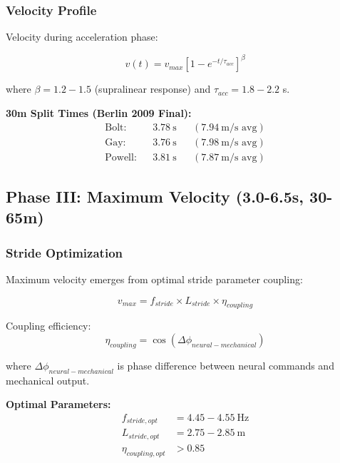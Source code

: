 \subsubsection{Velocity Profile}

Velocity during acceleration phase:

\begin{equation}
v(t) = v_{max} \left[1 - e^{-t/\tau_{acc}}\right]^{\beta}
\label{eq:velocity_acceleration}
\end{equation}

where $\beta = 1.2-1.5$ (supralinear response) and $\tau_{acc} = 1.8-2.2$ s.

\textbf{30m Split Times (Berlin 2009 Final):}
\begin{align}
\text{Bolt:} && 3.78~\text{s} && (7.94~\text{m/s avg}) \\
\text{Gay:} && 3.76~\text{s} && (7.98~\text{m/s avg}) \\
\text{Powell:} && 3.81~\text{s} && (7.87~\text{m/s avg})
\end{align}

\subsection{Phase III: Maximum Velocity (3.0-6.5s, 30-65m)}

\subsubsection{Stride Optimization}

Maximum velocity emerges from optimal stride parameter coupling:

\begin{equation}
v_{max} = f_{stride} \times L_{stride} \times \eta_{coupling}
\label{eq:max_velocity}
\end{equation}

Coupling efficiency:
\begin{equation}
\eta_{coupling} = \cos(\Delta\phi_{neural-mechanical})
\label{eq:coupling_efficiency}
\end{equation}

where $\Delta\phi_{neural-mechanical}$ is phase difference between neural commands and mechanical output.

\textbf{Optimal Parameters:}
\begin{align}
f_{stride,opt} &= 4.45-4.55~\text{Hz} \\
L_{stride,opt} &= 2.75-2.85~\text{m} \\
\eta_{coupling,opt} &> 0.85
\end{align}

